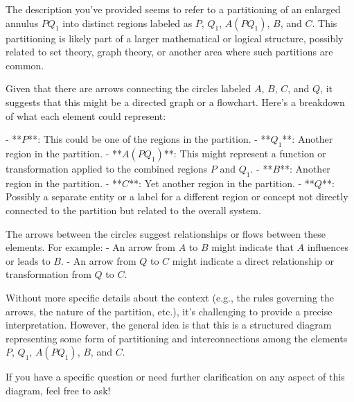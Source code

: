 The description you've provided seems to refer to a partitioning of an enlarged annulus \(PQ_1\) into distinct regions labeled as \(P\), \(Q_1\), \(A(PQ_1)\), \(B\), and \(C\). This partitioning is likely part of a larger mathematical or logical structure, possibly related to set theory, graph theory, or another area where such partitions are common.

Given that there are arrows connecting the circles labeled \(A\), \(B\), \(C\), and \(Q\), it suggests that this might be a directed graph or a flowchart. Here's a breakdown of what each element could represent:

- **\(P\)**: This could be one of the regions in the partition.
- **\(Q_1\)**: Another region in the partition.
- **\(A(PQ_1)\)**: This might represent a function or transformation applied to the combined regions \(P\) and \(Q_1\).
- **\(B\)**: Another region in the partition.
- **\(C\)**: Yet another region in the partition.
- **\(Q\)**: Possibly a separate entity or a label for a different region or concept not directly connected to the partition but related to the overall system.

The arrows between the circles suggest relationships or flows between these elements. For example:
- An arrow from \(A\) to \(B\) might indicate that \(A\) influences or leads to \(B\).
- An arrow from \(Q\) to \(C\) might indicate a direct relationship or transformation from \(Q\) to \(C\).

Without more specific details about the context (e.g., the rules governing the arrows, the nature of the partition, etc.), it's challenging to provide a precise interpretation. However, the general idea is that this is a structured diagram representing some form of partitioning and interconnections among the elements \(P\), \(Q_1\), \(A(PQ_1)\), \(B\), and \(C\).

If you have a specific question or need further clarification on any aspect of this diagram, feel free to ask!
